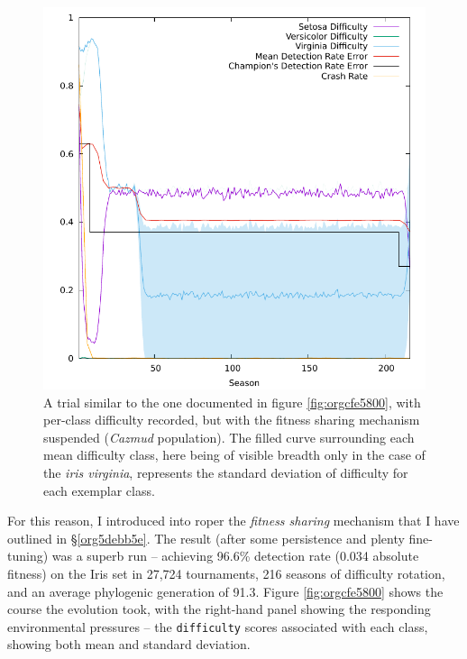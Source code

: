 \documentclass[12pt,glossary]{dalthesis}
\begin{document}
\begin{figure}[htbp]
\centering
\includegraphics[width=.9\linewidth]{../images/plots/nosharing.pdf}
\caption{\label{fig:org277d66b}
A trial similar to the one documented in figure \ref{fig:orgcfe5800}, with per-class difficulty recorded, but with the fitness sharing mechanism suspended (\emph{Cazmud} population). The filled curve surrounding each mean difficulty class, here being of visible breadth only in the case of the \emph{iris virginia}, represents the standard deviation of difficulty for each exemplar class.}
\end{figure}

For this reason, I introduced into \gls{roper} the \emph{fitness sharing} mechanism 
that I have outlined in \S \ref{org5debb5e}. 
 The result (after some persistence and plenty fine-tuning) was a superb run --
achieving 96.6\% detection rate (0.034 absolute fitness) on the Iris set in
27,724 tournaments, 216 seasons of difficulty rotation, and an average
phylogenic generation of 91.3. Figure \ref{fig:orgcfe5800} shows the course the
evolution took, with the right-hand panel showing the responding environmental
pressures -- the \texttt{difficulty} scores associated with each class, showing both
mean and standard deviation.
\end{document}
